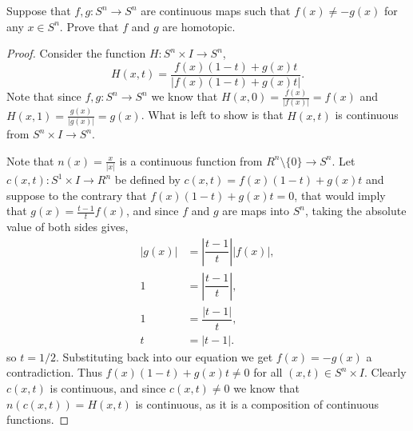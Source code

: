 \documentclass{homework651}
\begin{document}
\begin{problems}
\problem Suppose that $f, g: S^n \to S^n$ are continuous maps such that $f(x) \neq -g(x)$ for any $x \in S^n$. Prove that 
$f$ and $g$ are homotopic. 
\begin{proof} Consider the function $H:S^n \times I \to S^n$, 
    \begin{equation*}
        H(x, t) = \dfrac{f(x)(1 - t) + g(x)t}{|f(x)(1 - t) + g(x)t|}.
    \end{equation*}
    Note that since $f, g: S^n \to S^n$ we know that  $H(x, 0) = \frac{f(x)}{|f(x)|} = f(x)$ and $H(x, 1) = \frac{g(x)}{|g(x)|} = g(x)$.
    What is left to show is that $H(x, t)$ is continuous from $S^n \times I \to S^n$. 
    
    Note that $n(x) = \frac{x}{|x|}$ is a continuous function 
    from $R^n\setminus \{0\} \to S^n$. Let $c(x, t): S^1 \times I \to R^n$ be defined by $c(x, t) = f(x)(1 - t) + g(x)t$ and suppose to the contrary that $f(x)(1 - t) + g(x)t = 0$,
    that would imply that $g(x) = \frac{t - 1}{t}f(x)$, and since $f$ and $g$ are maps into $S^n$, taking the absolute value of 
    both sides gives, 
    \begin{align*}
        \left|g(x)\right| &= \left|\dfrac{t - 1}{t}\right|\left|f(x)\right|,\\
        1 &= \left|\dfrac{t - 1}{t}\right|,\\
        1 &= \dfrac{|t - 1|}{t},\\
        t &= \left|t - 1\right|.
    \end{align*}
    so $t = 1/2$. Substituting back into our equation we get $f(x) = -g(x)$ a contradiction. Thus $f(x)(1 - t) + g(x)t \neq 0$
    for all $(x, t) \in S^n \times I$. Clearly $c(x, t)$ is continuous, and since $c(x, t) \neq 0$ we know that $n(c(x, t)) = H(x, t)$ is continuous, as it is a composition of continuous functions. 
\end{proof}
                    

\end{problems}
\end{document}
